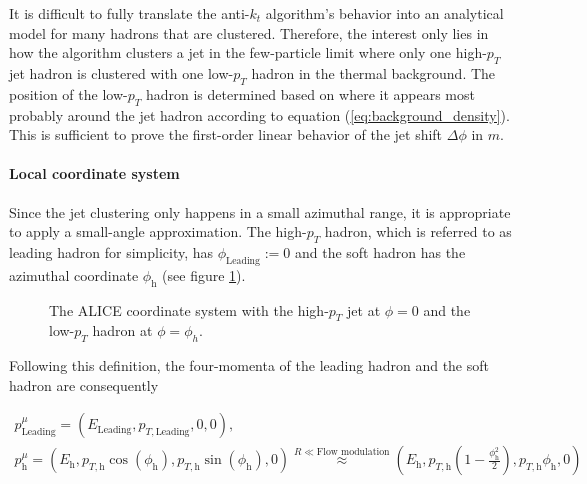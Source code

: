 \documentclass[
  a4paper,
  12pt,
  oneside,
  parskip=half,
  listof=totoc,
  bibliography=totoc,
  DIV=12,
  numbers=noenddot,
  BA.tex
  ]{subfiles}
\begin{document}
It is difficult to fully translate the anti-$k_t$ algorithm's behavior into an analytical model for many hadrons that are clustered. Therefore, the interest only lies in how the algorithm clusters a jet in the few-particle limit where only one high-$p_T$ jet hadron is clustered with one low-$p_T$ hadron in the thermal background. The position of the low-$p_T$ hadron is determined based on where it appears most probably around the jet hadron according to equation (\ref{eq:background_density}). This is sufficient to prove the first-order linear behavior of the jet shift $\Delta \phi$ in $m$.

\paragraph{Local coordinate system}

Since the jet clustering only happens in a small azimuthal range, it is appropriate to apply a small-angle approximation. The high-$p_T$ hadron, which is referred to as leading hadron for simplicity, has $\phi_\text{Leading} := 0$ and the soft hadron has the azimuthal coordinate $\phi_\text{h}$ (see figure \ref{fig:localcoord-shift}).

\begin{figure}[H]
	\centering
	\caption{The ALICE coordinate system with the high-$p_T$ jet at $\phi = 0$ and the low-$p_T$ hadron at $\phi = \phi_h$.}
	\label{fig:localcoord-shift}
\end{figure}

Following this definition, the four-momenta of the leading hadron and the soft hadron are consequently

\begin{equation}
	\begin{gathered}
		p_\text{Leading}^\mu = (E_\text{Leading}, p_{T,\text{Leading}}, 0, 0), \\
		p_\text{h}^\mu = (E_\text{h}, p_{T,\text{h}} \cos(\phi_\text{h}), p_{T,\text{h}} \sin(\phi_\text{h}), 0) \stackrel{R \ll \text{Flow modulation}}{\approx} (E_\text{h}, p_{T,\text{h}} (1-\frac{\phi_\text{h}^2}{2}), p_{T,\text{h}} \phi_\text{h}, 0)
	\end{gathered}
	\label{eq:four-momenta-approximation}
\end{equation}
\end{document}
